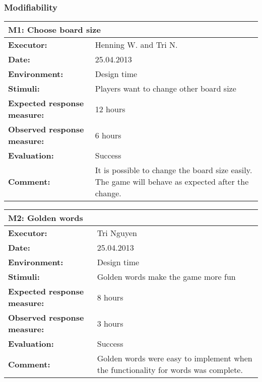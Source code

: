 \subsubsection{Modifiability}

\begin{tabular}{|m{}||m{}|}
\hline
\multicolumn{2}{|l|}{M1: Choose board size} \\ \hline
\textbf{Executor:} & Henning W. and Tri N.\\ \hline
\textbf{Date:} & 25.04.2013\\ \hline
\textbf{Environment:} & Design time\\ \hline
\textbf{Stimuli:} & Players want to change other board size\\ \hline
\textbf{Expected response measure:} & 12 hours\\ \hline
\textbf{Observed response measure:} & 6 hours\\ \hline
\textbf{Evaluation:} & Success\\ \hline
\textbf{Comment:} & It is possible to change the board size easily. The game will behave as expected after the change.\\ \hline
\end{tabular}

\begin{tabular}{|m{}||m{}|}
\hline
\multicolumn{2}{|l|}{M2: Golden words} \\ \hline
\textbf{Executor:} & Tri Nguyen\\ \hline
\textbf{Date:} & 25.04.2013\\ \hline
\textbf{Environment:} & Design time\\ \hline
\textbf{Stimuli:} & Golden words make the game more fun\\ \hline
\textbf{Expected response measure:} & 8 hours\\ \hline
\textbf{Observed response measure:} & 3 hours\\ \hline
\textbf{Evaluation:} & Success\\ \hline
\textbf{Comment:} & Golden words were easy to implement when the functionality for words was complete.\\ \hline
\end{tabular}

